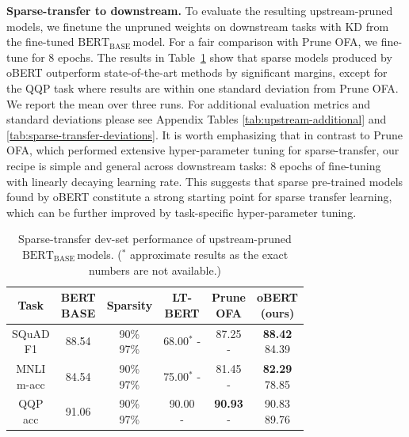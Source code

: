 \documentclass[11pt]{article}
\newcommand{\bert}{$\textrm{BERT}_{\textrm{BASE}}\,$}
\begin{document}
\noindent\textbf{Sparse-transfer to downstream.} To evaluate the resulting upstream-pruned models, we finetune the unpruned weights on downstream tasks with KD from the fine-tuned \bert model. For a fair comparison with Prune OFA, we fine-tune for 8 epochs. The results in Table~\ref{tab:sparse-transfer} show that sparse models produced by oBERT outperform state-of-the-art methods by significant margins, except for the QQP task where results are within one standard deviation from Prune OFA. We report the mean over three runs. For additional evaluation metrics and standard deviations please see Appendix Tables \ref{tab:upstream-additional} and \ref{tab:sparse-transfer-deviations}. It is worth emphasizing that in contrast to Prune OFA, which performed extensive hyper-parameter tuning for sparse-transfer, our recipe is simple and general across downstream tasks: 8 epochs of fine-tuning with linearly decaying learning rate. 
This suggests that sparse pre-trained models found by oBERT constitute a strong starting point for sparse transfer learning, which can be further improved by task-specific hyper-parameter tuning.

\begin{table}[tb!]
\setlength{\tabcolsep}{5.5pt}
    \centering
    {\small 
    \begin{tabular}{ccc|ccc}
    \toprule 
    Task & \makecell{BERT\\{\scriptsize BASE}} & Sparsity & \makecell{LT-\\BERT} & \makecell{Prune\\OFA} & \makecell{oBERT\\(ours)} \\
    \midrule
    \makecell{SQuAD \\ F1} & 88.54 & \makecell{90\% \\ 97\%} & \makecell{68.00$^*$\\-} & \makecell{87.25\\ -} & \makecell{\textbf{88.42}\\ 84.39} \\
    \midrule
    \makecell{MNLI \\ m-acc} & 84.54 & \makecell{90\% \\ 97\%}  & \makecell{75.00$^*$\\-} & \makecell{81.45\\ -} & \makecell{\textbf{82.29} \\ 78.85} \\
    \midrule
    \makecell{QQP \\ acc} & 91.06 &  \makecell{90\% \\ 97\%} & \makecell{90.00\\-} & \makecell{\textbf{90.93} \\ -} & \makecell{90.83 \\ 89.76} \\
    \bottomrule
    \end{tabular}
    }
    \caption{Sparse-transfer dev-set performance of upstream-pruned \bert models. ($^*$ approximate results as the exact numbers are not available.)}
    \label{tab:sparse-transfer}
    \vspace{-1.2em}
\end{table}
\end{document}
